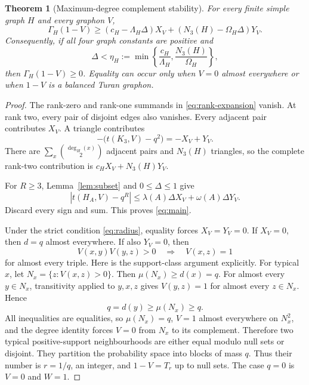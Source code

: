 \documentclass[11pt]{article}
\newtheorem{theorem}{Theorem}[section]
\begin{document}
\begin{theorem}[Maximum-degree complement stability]
\label{thm:main}
For every finite simple graph $H$ and every graphon $V$,
\begin{equation}
 \Gamma_H(1-V)\geq
 (c_H-\Lambda_H\Delta)X_V
 +(N_3(H)-\Omega_H\Delta)Y_V.
 \label{eq:main}
\end{equation}
Consequently, if all four graph constants are positive and
\begin{equation}
 \Delta<\eta_H:=
 \min\left\{\frac{c_H}{\Lambda_H},
             \frac{N_3(H)}{\Omega_H}\right\},
 \label{eq:radius}
\end{equation}
then $\Gamma_H(1-V)\geq0$.  Equality can occur only when $V=0$ almost
everywhere or when $1-V$ is a balanced Turan graphon.
\end{theorem}

\begin{proof}
The rank-zero and rank-one summands in \eqref{eq:rank-expansion} vanish.  At
rank two, every pair of disjoint edges also vanishes.  Every adjacent pair
contributes $X_V$.  A triangle contributes
\[
 -\bigl(t(K_3,V)-q^2\bigr)=-X_V+Y_V.
\]
There are $\sum_x\binom{\deg_H(x)}2$ adjacent pairs and $N_3(H)$ triangles,
so the complete rank-two contribution is
$c_HX_V+N_3(H)Y_V$.

For $R\geq3$, Lemma~\ref{lem:subset} and $0\leq\Delta\leq1$ give
\[
 \left|t(H_A,V)-q^R\right|
 \leq\lambda(A)\Delta X_V+\omega(A)\Delta Y_V.
\]
Discard every sign and sum.  This proves \eqref{eq:main}.

Under the strict condition \eqref{eq:radius}, equality forces $X_V=Y_V=0$.
If $X_V=0$, then $d=q$ almost everywhere.  If also $Y_V=0$, then
\[
 V(x,y)V(y,z)>0\quad\Longrightarrow\quad V(x,z)=1
\]
for almost every triple.  Here is the support-class argument explicitly.
For typical $x$, let $N_x=\{z:V(x,z)>0\}$.  Then
$\mu(N_x)\geq d(x)=q$.  For almost every $y\in N_x$, transitivity applied to
$y,x,z$ gives $V(y,z)=1$ for almost every $z\in N_x$.  Hence
\[
 q=d(y)\geq\mu(N_x)\geq q.
\]
All inequalities are equalities, so $\mu(N_x)=q$, $V=1$ almost everywhere
on $N_x^2$, and the degree identity forces $V=0$ from $N_x$ to its
complement.  Therefore two typical positive-support neighbourhoods are
either equal modulo null sets or disjoint.  They partition the probability
space into blocks of mass $q$.  Thus their number is $r=1/q$, an integer,
and $1-V=T_r$ up to null sets.  The case $q=0$ is $V=0$ and $W=1$.
\end{proof}
\end{document}
